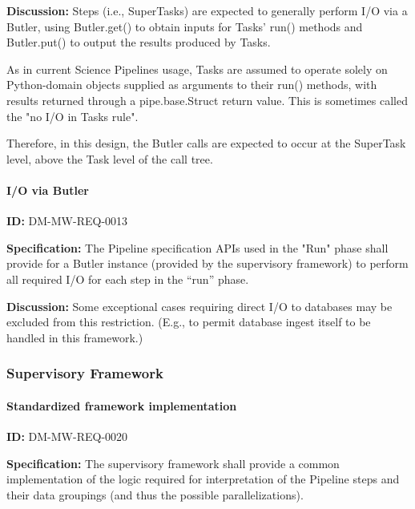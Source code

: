 \documentclass[SE,toc,lsstdraft]{lsstdoc}
\begin{document}
\textbf{Discussion:}
Steps (i.e., SuperTasks) are expected to generally perform I/O via a Butler, using Butler.get() to obtain inputs for Tasks' run() methods and Butler.put() to output the results produced by Tasks.

As in current Science Pipelines usage, Tasks are assumed to operate solely on Python-domain objects supplied as arguments to their run() methods, with results returned through a pipe.base.Struct return value. This is sometimes called the "no I/O in Tasks rule".

Therefore, in this design, the Butler calls are expected to occur at the SuperTask level, above the Task level of the call tree.




\paragraph{I/O via Butler}\hfill  %

\label{DM-MW-REQ-0013}
\textbf{ID:} DM-MW-REQ-0013

\textbf{Specification:}
The Pipeline specification APIs used in the "Run" phase shall provide for a Butler instance (provided by the supervisory framework) to perform all required I/O for each step in the “run” phase.

\textbf{Discussion:}
Some exceptional cases requiring direct I/O to databases may be excluded from this restriction. (E.g., to permit database ingest itself to be handled in this framework.)




\subsubsection{Supervisory Framework}





\paragraph{Standardized framework implementation}\hfill  %

\label{DM-MW-REQ-0020}
\textbf{ID:} DM-MW-REQ-0020

\textbf{Specification:}
The supervisory framework shall provide a common implementation of the logic required for interpretation of the Pipeline steps and their data groupings (and thus the possible parallelizations).
\end{document}
